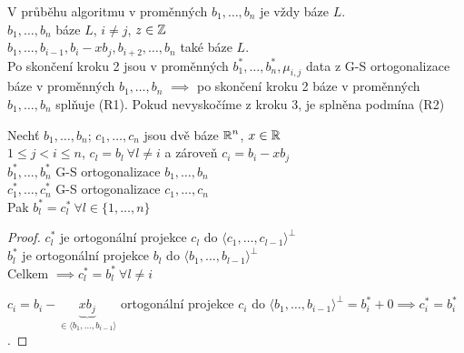 \begin{note}
V průběhu algoritmu v proměnných $b_1,\ldots, b_n$ je vždy báze $L$.\\
$b_1,\ldots, b_n$ báze $L$, $i\neq j$, $z\in\operatorname{\mathbb{Z}}$\\
$b_1,\ldots,b_{i-1},b_i-xb_j,b_{i+2},\ldots, b_n$ také báze $L$.\\

Po skončení kroku 2 jsou v proměnných $b_1^*,\ldots, b_n^*,\mu_{i,j}$ data z G-S ortogonalizace báze v proměnných $b_1,\ldots, b_n$ $\implies$ po skončení kroku 2 báze v proměnných $b_1,\ldots, b_n$  splňuje (R1). Pokud nevyskočíme z kroku 3, je splněna podmína (R2) 
\end{note}

\begin{claim}
Nechť $b_1,\ldots, b_n$; $c_1,\ldots, c_n$ jsou dvě báze $\operatorname{\mathbb{R}}^n$, $x\in\operatorname{\mathbb{R}}$\\
$1\leq j<i\leq n$, $c_l=b_l\ \forall l\neq i$ a zároveň $c_i=b_i-xb_j$\\
$b_1^*,\ldots, b_n^*$ G-S ortogonalizace $b_1,\ldots, b_n$\\
$c_1^*,\ldots, c_n^*$ G-S ortogonalizace $c_1,\ldots, c_n$\\
Pak $b_l^*=c_l^*\ \forall l\in\{1,\ldots,n\}$

\end{claim}
\begin{proof}
$c_l^*$ je ortogonální projekce $c_l$ do $\langle c_1, \ldots, c_{l-1} \rangle^\perp$\\
$b_l^*$ je ortogonální projekce $b_l$ do $\langle b_1, \ldots, b_{l-1} \rangle^\perp$\\
Celkem $\implies c_l^*=b_l^*\ \forall l\neq i$

$c_i=b_i-\underbrace{xb_j}_{\in\langle b_1,\ldots,b_{i-1}\rangle}$ ortogonální projekce $c_i$ do $\langle b_1, \ldots, b_{i-1} \rangle^\perp=b_i^*+0\implies c_i^*=b_i^*$.
\end{proof}

